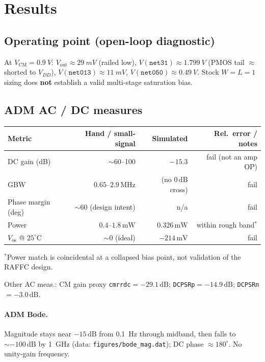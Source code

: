 \documentclass[11pt]{article}
\begin{document}
\section{Results}
\subsection{Operating point (open-loop diagnostic)}
At $V_{\mathrm{CM}}{=}\SI{0.9}{V}$: $V_{\mathrm{out}}{\approx}\SI{29}{mV}$ (railed low), $V(\texttt{net31}){\approx}\SI{1.799}{V}$ (PMOS tail $\approx$ shorted to $V_{DD}$), $V(\texttt{net013}){\approx}\SI{11}{mV}$, $V(\texttt{net050}){\approx}\SI{0.49}{V}$.
Stock $W{=}L{=}1$ sizing does \textbf{not} establish a valid multi-stage saturation bias.

\subsection{ADM AC / DC measures}
\begin{table}[h]
\centering
\begin{tabular}{@{}lrrr@{}}
\toprule
Metric & Hand / small-signal & Simulated & Rel.\ error / notes \\
\midrule
DC gain (dB) & $\sim$60--100 & $-15.3$ & fail (not an amp OP) \\
GBW & $0.65$--$2.9\,\mathrm{MHz}$ & (no $0\,\mathrm{dB}$ cross) & fail \\
Phase margin (deg) & $\sim$60 (design intent) & n/a & fail \\
Power & $0.4$--$1.8\,\mathrm{mW}$ & $0.326\,\mathrm{mW}$ & within rough band$^*$ \\
$V_{\mathrm{os}}$ @ $25^\circ\mathrm{C}$ & $\sim$0 (ideal) & $-214\,\mathrm{mV}$ & fail \\
\bottomrule
\end{tabular}
\end{table}
{\footnotesize $^*$Power match is coincidental at a collapsed bias point, not validation of the RAFFC design.}

Other AC meas.: CM gain proxy \texttt{cmrrdc}${=}-29.1\,\mathrm{dB}$; \texttt{DCPSRp}${=}-14.9\,\mathrm{dB}$; \texttt{DCPSRn}${=}-3.0\,\mathrm{dB}$.

\paragraph{ADM Bode.} Magnitude stays near $-15\,\mathrm{dB}$ from \SI{0.1}{Hz} through midband, then falls to $\sim-100\,\mathrm{dB}$ by \SI{1}{GHz} (data: \texttt{figures/bode\_mag.dat}); DC phase $\approx 180^\circ$. No unity-gain frequency.
\end{document}
